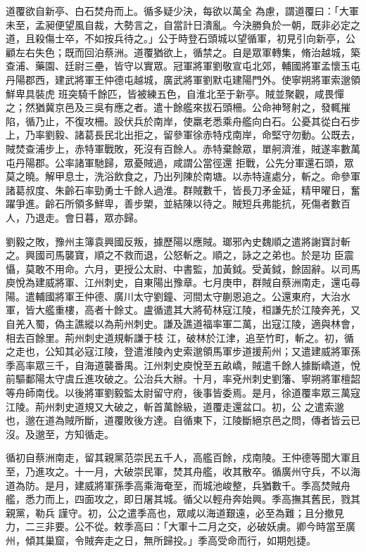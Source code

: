 \begin{pinyinscope}
 道覆欲自新亭、白石焚舟而上。循多疑少決，每欲以萬全
 為慮，謂道覆曰：「大軍未至，孟昶便望風自裁，大勢言之，自當計日潰亂。今決勝負於一朝，既非必定之道，且殺傷士卒，不如按兵待之。」公于時登石頭城以望循軍，初見引向新亭，公顧左右失色；既而回泊蔡洲。道覆猶欲上，循禁之。自是眾軍轉集，脩治越城，築查浦、藥園、廷尉三壘，皆守以實眾。冠軍將軍劉敬宣屯北郊，輔國將軍孟懷玉屯丹陽郡西，建武將軍王仲德屯越城，廣武將軍劉默屯建陽門外。使寧朔將軍索邈領鮮卑具裝虎
 班突騎千餘匹，皆被練五色，自淮北至于新亭。賊並聚觀，咸畏憚之；然猶冀京邑及三吳有應之者。遣十餘艦來拔石頭柵。公命神弩射之，發輒摧陷，循乃止，不復攻柵。設伏兵於南岸，使羸老悉乘舟艦向白石。公憂其從白石步上，乃率劉毅、諸葛長民北出拒之，留參軍徐赤特戍南岸，命堅守勿動。公既去，賊焚查浦步上，赤特軍戰敗，死沒有百餘人。赤特棄餘眾，單舸濟淮，賊遂率數萬屯丹陽郡。公率諸軍馳歸，眾憂賊過，咸謂公當徑還
 拒戰，公先分軍還石頭，眾莫之曉。解甲息士，洗浴飲食之，乃出列陳於南塘。以赤特違處分，斬之。命參軍諸葛叔度、朱齡石率勁勇士千餘人過淮。群賊數千，皆長刀矛金延，精甲曜日，奮躍爭進。齡石所領多鮮卑，善步槊，並結陳以待之。賊短兵弗能抗，死傷者數百人，乃退走。會日暮，眾亦歸。



 劉毅之敗，豫州主簿袁興國反叛，據歷陽以應賊。瑯邪內史魏順之遣將謝寶討斬之。興國司馬襲寶，順之不救而退，公怒斬之。順之，詠之之弟也。於是功
 臣震懾，莫敢不用命。六月，更授公太尉、中書監，加黃鉞。受黃鉞，餘固辭。以司馬庾悅為建威將軍、江州刺史，自東陽出豫章。七月庚申，群賊自蔡洲南走，還屯尋陽。遣輔國將軍王仲德、廣川太守劉鐘、河間太守蒯恩追之。公還東府，大治水軍，皆大艦重樓，高者十餘丈。盧循遣其大將荀林寇江陵，桓謙先於江陵奔羌，又自羌入蜀，偽主譙縱以為荊州刺史。謙及譙道福率軍二萬，出寇江陵，適與林會，相去百餘里。荊州刺史道規斬謙于枝
 江，破林於江津，追至竹町，斬之。初，循之走也，公知其必寇江陵，登遣淮陵內史索邈領馬軍步道援荊州；又遣建威將軍孫季高率眾三千，自海道襲番禺。江州刺史庾悅至五畝嶠，賊遣千餘人據斷嶠道，悅前驅鄱陽太守虞丘進攻破之。公治兵大辦。十月，率兗州刺史劉籓、寧朔將軍檀韶等舟師南伐。以後將軍劉毅監太尉留守府，後事皆委焉。是月，徐道覆率眾三萬寇江陵。荊州刺史道規又大破之，斬首萬餘級，道覆走還盆口。初，公
 之遣索邈也，邈在道為賊所斷，道覆敗後方達。自循東下，江陵斷絕京邑之問，傳者皆云已沒。及邈至，方知循走。



 循初自蔡洲南走，留其親黨范崇民五千人，高艦百餘，戍南陵。王仲德等聞大軍且至，乃進攻之。十一月，大破崇民軍，焚其舟艦，收其散卒。循廣州守兵，不以海道為防。是月，建威將軍孫季高乘海奄至，而城池峻整，兵猶數千。季高焚賊舟艦，悉力而上，四面攻之，即日屠其城。循父以輕舟奔始興。季高撫其舊民，戮其親黨，勒兵
 謹守。初，公之遣季高也，眾咸以海道艱遠，必至為難；且分撤見力，二三非要。公不從。敕季高曰：「大軍十二月之交，必破妖虜。卿今時當至廣州，傾其巢窟，令賊奔走之日，無所歸投。」季高受命而行，如期剋捷。




\end{pinyinscope}
